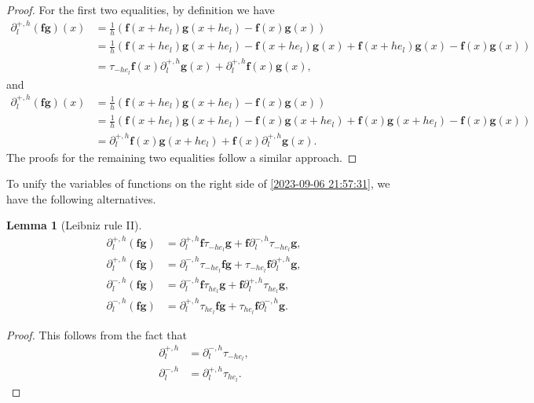 \documentclass{amsart}
\newtheorem{lemma}[theorem]{Lemma}
\theoremstyle{definition}
\theoremstyle{remark}
\numberwithin{equation}{section}
\newcommand{\p}{\partial}
\newcommand{\f}{\bm{f}}
\newcommand{\g}{\bm{g}}
\begin{document}
\begin{proof}
	For the first two equalities,
	by definition we have
	\begin{equation*}
		\begin{aligned}
			\p_l^{+,h}(\f\g)(x)&= \frac{1}{h}(\f(x+he_l)\g(x+he_l)-\f(x)\g(x))\\&= \frac{1}{h} (\f(x+he_l)\g(x+he_l)-\f(x+he_l)\g(x)+\f(x+he_l)\g(x)-\f(x)\g(x)) \\&= \tau_{-he_l}\f(x) \p^{+,h}_l\g(x) +\p_l^{+,h}\f(x)\g(x),
		\end{aligned}
	\end{equation*}
	and \begin{equation*}
		\begin{aligned}
			\p_l^{+,h}(\f\g)(x)&=\frac{1}{h}(\f(x+he_l)\g(x+he_l)-\f(x)\g(x))\\&=\frac{1}{h}(\f(x+he_l)\g(x+he_l)-\f(x)\g(x+he_l)+\f(x)\g(x+he_l)-\f(x)\g(x))\\&=\p_l^{+,h}\f(x)\g(x+he_l)+\f(x)\p_l^{+,h}\g(x).
		\end{aligned}
	\end{equation*}
	The proofs for the remaining two equalities follow a similar approach.
\end{proof}

To unify the variables of functions on the right side of \eqref{2023-09-06 21:57:31}, we have the following alternatives.
\begin{lemma}
	[Leibniz rule II]
	\begin{equation}
		\label{2023-09-07 17:40:22}
		\begin{aligned}
			\p^{+,h}_l(\f \g)&= \p^{+,h}_l \f \tau_{-he_l}\g +\f \p_l^{-,h} \tau_{-he_l}\g,\\
			\p^{+,h}_l(\f \g)&=\p_l^{-,h} \tau_{-he_l}\f\g+\tau_{-he_l}\f\p_l^{+,h}\g,\\
			\p^{-,h}_l(\f \g)&=\p_l^{-,h}\f \tau_{he_l}\g+\f\p_{l}^{+,h}\tau_{he_l}\g,     \\\p^{-,h}_l(\f \g)&   = \p_l^{+,h}\tau_{he_l}\f \g+ \tau_{he_l}\f \p_l^{-,h}\g.
		\end{aligned}
	\end{equation}
\end{lemma}
\begin{proof}
	This follows from the fact that
	\begin{equation}
		\begin{aligned}
			\p_l^{+,h}&=\p_l^{-,h}\tau_{-he_l},\\
			\p_l^{-,h}&=\p_l^{+,h}\tau_{he_l}.
		\end{aligned}
	\end{equation}
	
\end{proof}
\end{document}

